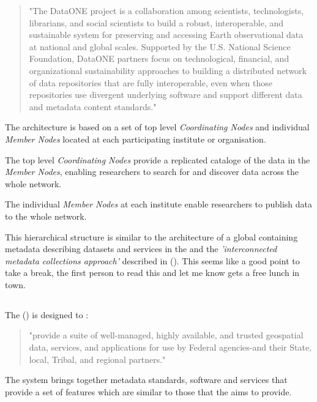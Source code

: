 \documentclass{article}
\begin{document}
\begin{quote}
"The DataONE project is a collaboration among scientists, technologists,
librarians, and social scientists to build a robust, interoperable,
and sustainable system for preserving and accessing Earth observational
data at national and global scales. Supported by the U.S. National
Science Foundation, DataONE partners focus on technological, financial,
and organizational sustainability approaches to building a distributed
network of data repositories that are fully interoperable, even when those
repositories use divergent underlying software and support different data
and metadata content standards."
\end{quote}

The \cite{data-one} architecture is based on a set of top level
\textit{Coordinating Nodes} and individual \textit{Member Nodes} located
at each participating institute or organisation.

The top level \textit{Coordinating Nodes} provide a replicated cataloge of
the data in the \textit{Member Nodes}, enabling researchers to search for
and discover data across the whole network.

The individual \textit{Member Nodes} at each institute enable researchers
to publish data to the whole \cite{data-one} network.

This hierarchical structure is similar to the \cite{vo} architecture of a global
\cite{ivoa-reg} containing metadata describing datasets and services in the
\cite{vo} and the \textit{'interconnected metadata collections approach'}
described in  (\cite{jones-2006}). This seems like
a good point to take a break, the first person to read this and let me know
gets a free lunch in town.

\subsection{}

The  (\cite{fgdc})  is designed to :

\begin{quote}
"provide a suite of well-managed, highly available, and trusted geospatial 
data, services, and applications for use by Federal agencies-and their State,
local, Tribal, and regional partners."
\end{quote}

The \cite{fgdc-geo} system brings together metadata standards, software
and services that provide a set of features which are similar to those that
the \cite{trop} aims to provide.
\end{document}
